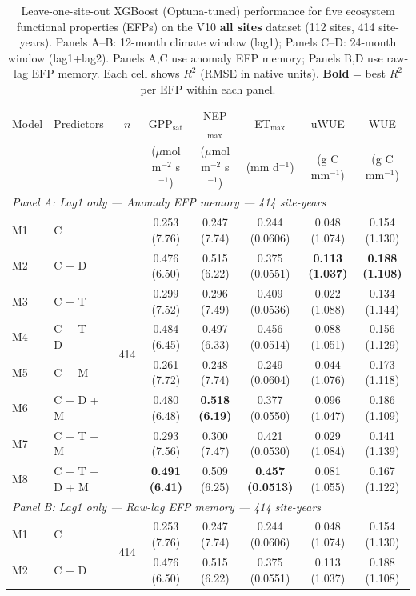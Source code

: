 \begin{table}[htbp]
\centering
\caption{Leave-one-site-out XGBoost (Optuna-tuned) performance for five ecosystem functional properties (EFPs) on the V10 \textbf{all sites} dataset (112 sites, 414 site-years). Panels A--B: 12-month climate window (lag1); Panels C--D: 24-month window (lag1+lag2). Panels A,C use anomaly EFP memory; Panels B,D use raw-lag EFP memory. Each cell shows $R^2$ (RMSE in native units). \textbf{Bold} = best $R^2$ per EFP within each panel.}
\label{tab:XGBoptuna_LOSO_v10_all_sites}
\footnotesize
\setlength{\tabcolsep}{4pt}
\begin{tabular}{llcccccc}
\toprule
Model & Predictors & $n$ & GPP$_\mathrm{sat}$ & NEP$_\mathrm{max}$ & ET$_\mathrm{max}$ & uWUE & WUE \\
  &  &  & ($\mu$mol m$^{-2}$ s$^{-1}$) & ($\mu$mol m$^{-2}$ s$^{-1}$) & (mm d$^{-1}$) & (g C mm$^{-1}$) & (g C mm$^{-1}$) \\
\midrule
\multicolumn{8}{l}{\textit{Panel A: Lag1 only --- Anomaly EFP memory --- 414 site-years}} \\
\midrule
M1 & C & \multirow{8}{*}{414} & 0.253 (7.76) & 0.247 (7.74) & 0.244 (0.0606) & 0.048 (1.074) & 0.154 (1.130) \\
M2 & C + D &  & 0.476 (6.50) & 0.515 (6.22) & 0.375 (0.0551) & \textbf{0.113 (1.037)} & \textbf{0.188 (1.108)} \\
M3 & C + T &  & 0.299 (7.52) & 0.296 (7.49) & 0.409 (0.0536) & 0.022 (1.088) & 0.134 (1.144) \\
M4 & C + T + D &  & 0.484 (6.45) & 0.497 (6.33) & 0.456 (0.0514) & 0.088 (1.051) & 0.156 (1.129) \\
M5 & C + M &  & 0.261 (7.72) & 0.248 (7.74) & 0.249 (0.0604) & 0.044 (1.076) & 0.173 (1.118) \\
M6 & C + D + M &  & 0.480 (6.48) & \textbf{0.518 (6.19)} & 0.377 (0.0550) & 0.096 (1.047) & 0.186 (1.109) \\
M7 & C + T + M &  & 0.293 (7.56) & 0.300 (7.47) & 0.421 (0.0530) & 0.029 (1.084) & 0.141 (1.139) \\
M8 & C + T + D + M &  & \textbf{0.491 (6.41)} & 0.509 (6.25) & \textbf{0.457 (0.0513)} & 0.081 (1.055) & 0.167 (1.122) \\
\midrule
\multicolumn{8}{l}{\textit{Panel B: Lag1 only --- Raw-lag EFP memory --- 414 site-years}} \\
\midrule
M1 & C & \multirow{8}{*}{414} & 0.253 (7.76) & 0.247 (7.74) & 0.244 (0.0606) & 0.048 (1.074) & 0.154 (1.130) \\
M2 & C + D &  & 0.476 (6.50) & 0.515 (6.22) & 0.375 (0.0551) & 0.113 (1.037) & 0.188 (1.108) \\

\end{tabular}
\end{table}
